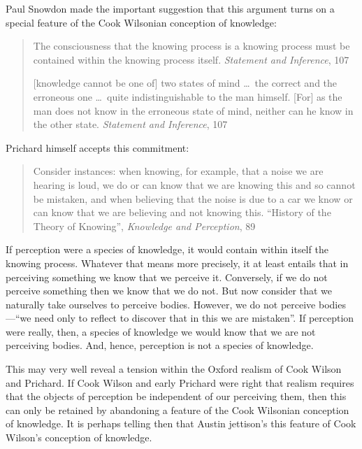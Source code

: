 \documentclass[11pt]{article}
\begin{document}
\begin{discussion}
    Paul Snowdon made the important suggestion that this argument turns on a special feature of the Cook Wilsonian conception of knowledge:
    \begin{quote}
        The consciousness that the knowing process is a knowing process must be contained within the knowing process itself. \emph{Statement and Inference}, 107
        
        [knowledge cannot be one of] two states of mind \ldots\ the correct and the erroneous one \ldots\ quite indistinguishable to the man himself. [For] as the man does not know in the erroneous state of mind, neither can he know in the other state. \emph{Statement and Inference}, 107
    \end{quote}
Prichard himself accepts this commitment:
\begin{quote}
    Consider instances: when knowing, for example, that a noise we are hearing is loud, we do or can know that we are knowing this and so cannot be mistaken, and when believing that the noise is due to a car we know or can know that we are believing and not knowing this. ``History of the Theory of Knowing'', \emph{Knowledge and Perception}, 89
\end{quote}

If perception were a species of knowledge, it would contain within itself the knowing process. Whatever that means more precisely, it at least entails that in perceiving something we know that we perceive it. Conversely, if we do not perceive something then we know that we do not. But now consider that we naturally take ourselves to perceive bodies. However, we do not perceive bodies---``we need only to reflect to discover that in this we are mistaken''. If perception were really, then, a species of knowledge we would know that we are not perceiving bodies. And, hence, perception is not a species of knowledge.

This may very well reveal a tension within the Oxford realism of Cook Wilson and Prichard. If Cook Wilson and early Prichard were right that realism requires that the objects of perception be independent of our perceiving them, then this can only be retained by abandoning a feature of the Cook Wilsonian conception of knowledge. It is perhaps telling then that Austin jettison's this feature of Cook Wilson's conception of knowledge.
\end{discussion}
\end{document}
